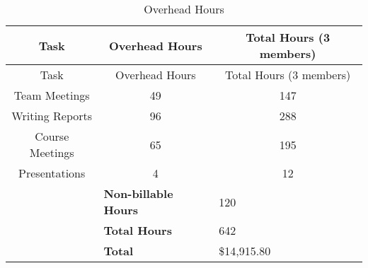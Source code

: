 \begin{center}
\setlength{\extrarowheight}{1.5pt}
  \begin{longtable}{|c|c|c|}
 \caption{Overhead Hours\label{overheadHours}} \\
   \hline
  
  \centering Task & Overhead Hours & Total Hours (3 members) \\
  \hline \hline \endfirsthead
  
     \hline

	\centering Task & Overhead Hours & Total Hours (3 members) \\
	\hline \hline \endhead

 \endfoot  

	Team Meetings & 49 & 147 \\ \hline
	Writing Reports & 96 & 288 \\ \hline
	Course Meetings & 65 & 195 \\ \hline	  
	Presentations & 4 & 12 \\ \hline
  \multicolumn{1}{l}{}      & \multicolumn{1}{l}{\textbf{Non-billable Hours}} & \multicolumn{1}{l}{120}  \\
  \multicolumn{1}{l}{}      & \multicolumn{1}{l}{\textbf{Total Hours}} & \multicolumn{1}{l}{642}  \\
  \multicolumn{1}{l}{}      & \multicolumn{1}{l}{\textbf{Total}} & \multicolumn{1}{l}{\$14,915.80}  \\
    \end{longtable}
\end{center}

